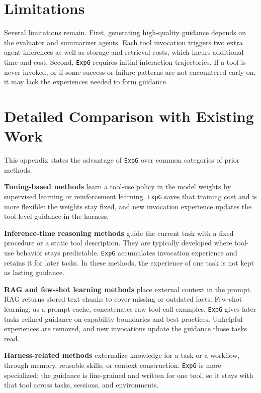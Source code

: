 \documentclass[11pt]{article}
\newcommand{\ours}{\texttt{ExpG}}
\begin{document}
\section*{Limitations}
Several limitations remain.
First, generating high-quality guidance depends on the evaluator and summarizer agents. Each tool invocation triggers two extra agent inferences as well as storage and retrieval costs, which incurs additional time and cost.
Second, {\ours} requires initial interaction trajectories. If a tool is never invoked, or if some success or failure patterns are not encountered early on, it may lack the experiences needed to form guidance.



\appendix

\section{Detailed Comparison with Existing Work}\label{app:compare}
This appendix states the advantage of {\ours} over common categories of prior methods.

\textbf{Tuning-based methods} learn a tool-use policy in the model weights by supervised learning or reinforcement learning. {\ours} saves that training cost and is more flexible: the weights stay fixed, and new invocation experience updates the tool-level guidance in the harness.

\textbf{Inference-time reasoning methods} guide the current task with a fixed procedure or a static tool description. They are typically developed where tool-use behavior stays predictable. {\ours} accumulates invocation experience and retains it for later tasks. In these methods, the experience of one task is not kept as lasting guidance.

\textbf{RAG and few-shot learning methods} place external context in the prompt. RAG returns stored text chunks to cover missing or outdated facts. Few-shot learning, as a prompt cache, concatenates raw tool-call examples. {\ours} gives later tasks refined guidance on capability boundaries and best practices. Unhelpful experiences are removed, and new invocations update the guidance those tasks read.

\textbf{Harness-related methods} externalize knowledge for a task or a workflow, through memory, reusable skills, or context construction. {\ours} is more specialized: the guidance is fine-grained and written for one tool, so it stays with that tool across tasks, sessions, and environments. 
\end{document}
